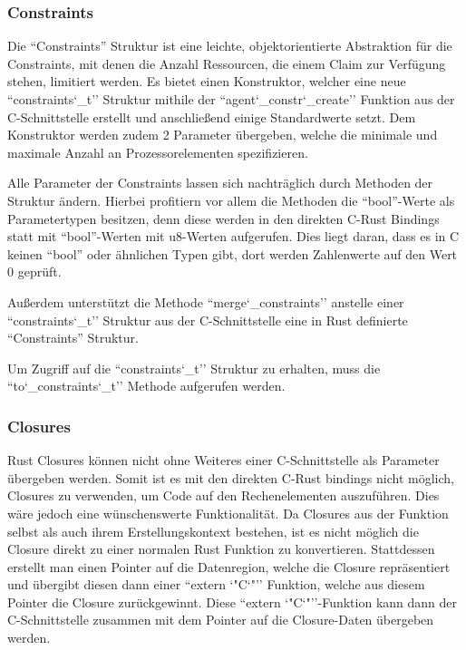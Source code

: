 \subsubsection{Constraints}

Die ``Constraints'' Struktur ist eine leichte, objektorientierte Abstraktion für die Constraints, mit denen die Anzahl Ressourcen, die
einem Claim zur Verfügung stehen, limitiert werden.
Es bietet einen Konstruktor, welcher eine neue ``constraints\char`_t'' Struktur mithile der ``agent\char`_constr\char`_create''
Funktion aus der C-Schnittstelle erstellt und anschließend einige Standardwerte setzt. Dem Konstruktor werden
zudem 2 Parameter übergeben, welche die minimale und maximale Anzahl an Prozessorelementen spezifizieren.

Alle Parameter der Constraints lassen sich nachträglich durch Methoden der Struktur ändern. Hierbei profitiern vor allem die Methoden
die ``bool''-Werte als Parametertypen besitzen, denn diese werden in den direkten C-Rust Bindings statt mit ``bool''-Werten mit
u8-Werten aufgerufen. Dies liegt daran, dass es in C keinen ``bool'' oder ähnlichen Typen gibt, dort werden Zahlenwerte auf den
Wert 0 geprüft.

Außerdem unterstützt die Methode ``merge\char`_constraints'' anstelle einer ``constraints\char`_t'' Struktur aus der
C-Schnittstelle eine in Rust definierte ``Constraints'' Struktur.

Um Zugriff auf die ``constraints\char`_t'' Struktur zu erhalten, muss die ``to\char`_constraints\char`_t'' Methode aufgerufen werden.

\subsubsection{Closures}

Rust Closures können nicht ohne Weiteres einer C-Schnittstelle als Parameter übergeben werden. Somit ist es mit den direkten
C-Rust bindings nicht möglich, Closures zu verwenden, um Code auf den Rechenelementen auszuführen. Dies wäre jedoch eine
wünschenswerte Funktionalität. Da Closures aus der Funktion selbst als auch ihrem Erstellungskontext\cite{closureWikiDe}
bestehen, ist es nicht möglich die Closure direkt zu einer normalen Rust Funktion zu konvertieren. Stattdessen erstellt
man einen Pointer auf die Datenregion, welche die Closure repräsentiert und übergibt diesen dann einer
``extern \char`"C\char`"'' Funktion, welche aus diesem Pointer die Closure zurückgewinnt.
Diese ``extern \char`"C\char`"''-Funktion kann dann der C-Schnittstelle zusammen mit dem Pointer
auf die Closure-Daten übergeben werden.

